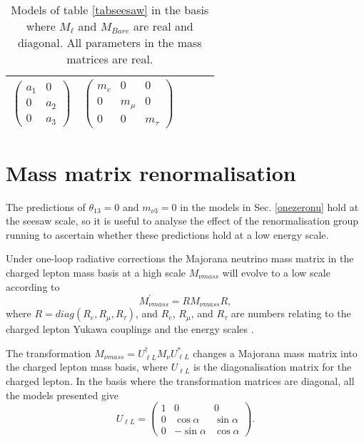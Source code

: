 \documentclass[nofootinbib,showpacs]{revtex4}
\begin{document}
\begin{table}
\begin{center}
\begin{tabular}{|l|l|l|l|l|}
$\left(\begin{array}{cc}a_1&0\\0&a_2\\0&a_3\end{array}\right)$&
$\left(\begin{array}{ccc}m_e&0&0\\0&m_\mu&0\\0&0&m_\tau\end{array}\right)$
\\
\hline
\end{tabular}
\end{center}
\caption{Models of table \ref{tabseesaw} in the basis where $M_\ell$ and $M_{Bare}$ are real and diagonal. All parameters in the mass matrices are real.}
\label{tabbasis}
\end{table}


\section{Mass matrix renormalisation}\label{rges}

The predictions of $\theta_{13}=0$ and $m_{\nu 3}=0$ in the models in Sec. \ref{onezeronu} hold at the seesaw scale, so it is useful to analyse the effect of the renormalisation group running to ascertain whether these predictions hold at a low energy scale. 

Under one-loop radiative corrections the Majorana neutrino mass matrix in the charged lepton mass basis at a high scale $M_{\nu mass}$ will evolve to a low scale according to   
\begin{equation}
M^{'}_{\nu mass}= R M_{\nu mass} R, 
\end{equation}
where $R=diag(R_e, R_\mu, R_\tau)$, and $R_e$, $R_\mu$, and $R_\tau$ are numbers relating to the charged lepton Yukawa couplings and the energy scales \cite{rgesmirnov,rgemunich}.

The transformation $M_{\nu mass}= U^\dagger_{\ell L} M_\nu U^*_{\ell L}$ changes a Majorana mass matrix into the charged lepton mass basis, where $U_{\ell L}$ is the diagonalisation matrix for the charged lepton. In the basis where the transformation matrices are diagonal, all the models presented give
\begin{equation}
U_{\ell L}=\left(\begin{array}{ccc}1&0&0\\0&\cos \alpha & \sin \alpha \\0&-\sin \alpha & \cos \alpha \end{array}\right).
\end{equation}  
\end{document}
